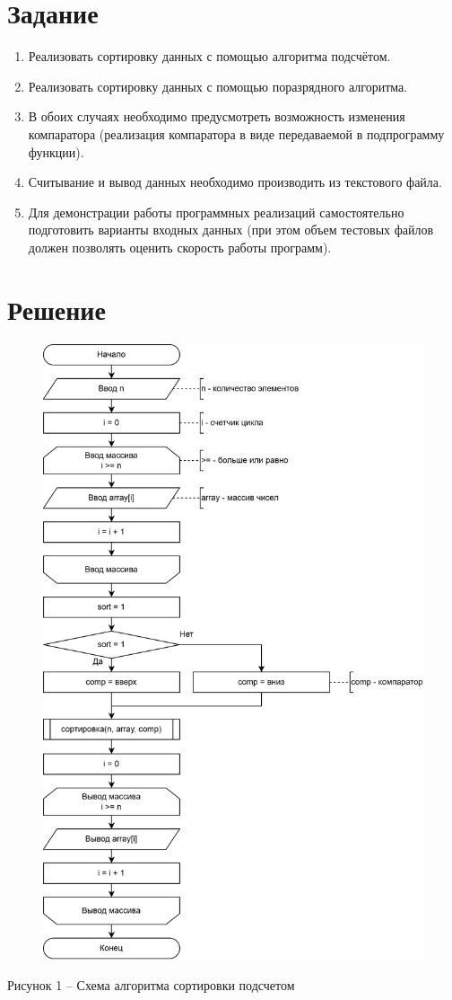\documentclass[a4paper,14pt]{extarticle}
\begin{document}
  \section*{Задание}
  \begin{enumerate}
    \item Реализовать сортировку данных с помощью алгоритма подсчётом.
    
    \item Реализовать сортировку данных с помощью поразрядного алгоритма.
    
    \item В обоих случаях необходимо предусмотреть возможность изменения компаратора (реализация компаратора в виде передаваемой в подпрограмму функции).
    
    \item Считывание и вывод данных необходимо производить из текстового файла.
    
    \item Для демонстрации работы программных реализаций самостоятельно подготовить варианты входных данных (при этом объем тестовых файлов должен позволять оценить скорость работы программ).
  \end{enumerate}

  \pagebreak
  \section*{Решение}

  \begin{figure}[h]
    \centering
    \includegraphics[width=0.7\linewidth]{images/s-1-1}
  \end{figure}
  \begin{center}
    Рисунок 1 – Схема алгоритма сортировки подсчетом
  \end{center}
\end{document}
